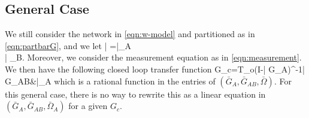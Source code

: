\documentclass[journal,twoside,web]{ieeecolor}
\begin{document}
\subsection{General Case}\label{sec:identifiability-general}
%
We still consider the network in \eqref{eqn:w-model} and partitioned as in \eqref{eqn:partbarG}, and we let 
%
\BEQ\label{eqn:partbarOmega}
\bar{ \Omega}=\BBM \bar{\Omega}_A\\\bar{ \Omega}_B\EBM.
\EEQ
%
Moreover, we consider the measurement equation as in \eqref{eqn:measurement}. 
We then have the following closed loop transfer function
%
\BEQ\label{eqn:closedloopgeneral}
 G_c=T_o(I-\bar{ G}_A)^{-1}\BBM \bar{ G}_{AB}&\bar{\Omega}_A\EBM
\EEQ
%
which is a rational function in the entries of $(\bar{ G}_A,\bar{ G}_{AB},\bar{ \Omega})$. For this general
case, there is no way to rewrite this as a linear equation in $(\bar{ G}_A,\bar{ G}_{AB},\bar{ \Omega}_A)$  for
a given $ G_c$. 
\fi
\end{document}
